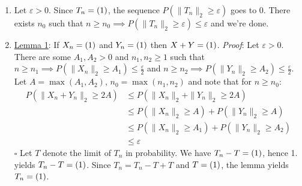 \documentclass[a4paper,11pt]{article}
\let\o\relax
\DeclareMathOperator*{\o}{\mathit o_{\mathbb P}}
\let\O\relax
\DeclareMathOperator*{\O}{\mathit O_{\mathbb P}}
\begin{document}
\begin{enumerate}
  \item Let $\varepsilon>0$. Since $T_n=\o(1)$, the sequence $P(\|T_n\|_2\geq \varepsilon)$ goes to $0$. There exists $n_0$ such that $n\geq n_0\implies P(\|T_n\|_2\geq \varepsilon) \leq \varepsilon$ and we're done.

  \item \underline{Lemma 1}: If $X_n=\O(1)$ and $Y_n=\O(1)$ then $X+Y=\O(1)$. \newline
  \textit{Proof}: Let $\varepsilon>0$. There are some $A_1, A_2>0$ and $n_1,n_2\geq 1$ such that $n\geq n_1 \implies P(\|X_n\|_2\geq A_1)\leq \frac \varepsilon 2$ and $n\geq n_2 \implies P(\|Y_n\|_2\geq A_2)\leq \frac \varepsilon 2$. Let $A=\max(A_1,A_2)$, $n_0=\max(n_1,n_2)$ and note that for $n\geq n_0$: 
  $$\begin{aligned}
  P(\|X_n+Y_n\|_2\geq 2A) &\leq P(\|X_n\|_2+\|Y_n\|_2\geq 2A)\\ 
  &\leq P(\|X_n\|_2\geq A) + P(\|Y_n\|_2\geq A) \\
  &\leq P(\|X_n\|_2\geq A_1) + P(\|Y_n\|_2\geq A_2)\\
  &\leq \varepsilon
  \end{aligned}
  $$
  \hfill $\square$\newline
  Let $T$ denote the limit of $T_n$ in probability. We have $T_n-T=\o(1)$, hence 1. yields $T_n-T=\O(1)$. Since $T_n = T_n-T+T$ and $T=\O(1)$, the lemma yields $T_n = \O(1)$. 


\end{enumerate}
\end{document}
